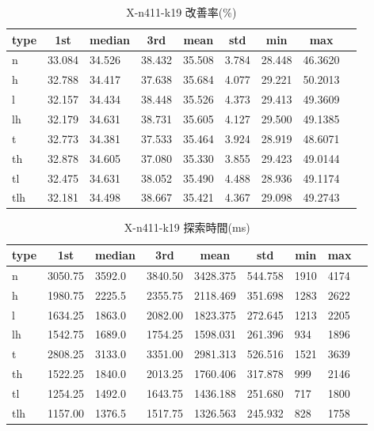 \begin{table}[htbp]
    \caption{X-n411-k19 改善率(\%)}
    \begin{tabular}{|l|l|l|l|l|l|l|l|l|}\hline
    \multicolumn{1}{|c|}{\textbf{type}}
    &\multicolumn{1}{|c|}{\textbf{1st}}
    &\multicolumn{1}{c|}{\textbf{median}}
    &\multicolumn{1}{c|}{\textbf{3rd}}
    &\multicolumn{1}{c|}{\textbf{mean}}
    &\multicolumn{1}{c|}{\textbf{std}}
    &\multicolumn{1}{c|}{\textbf{min}}
    &\multicolumn{1}{c|}{\textbf{max}}\\\hline
	n & 33.084 & 34.526 & 38.432 & 35.508 & 3.784 & 28.448 & 46.3620\\\hline
	h & 32.788 & 34.417 & 37.638 & 35.684 & 4.077 & 29.221 & 50.2013\\\hline
	l & 32.157 & 34.434 & 38.448 & 35.526 & 4.373 & 29.413 & 49.3609\\\hline
	lh & 32.179 & 34.631 & 38.731 & 35.605 & 4.127 & 29.500 & 49.1385\\\hline
	t & 32.773 & 34.381 & 37.533 & 35.464 & 3.924 & 28.919 & 48.6071\\\hline
	th & 32.878 & 34.605 & 37.080 & 35.330 & 3.855 & 29.423 & 49.0144\\\hline
	tl & 32.475 & 34.631 & 38.052 & 35.490 & 4.488 & 28.936 & 49.1174\\\hline
	tlh & 32.181 & 34.498 & 38.667 & 35.421 & 4.367 & 29.098 & 49.2743\\\hline
	\end{tabular}
\end{table}
\begin{table}[htbp]
    \caption{X-n411-k19 探索時間(ms)}
    \begin{tabular}{|l|l|l|l|l|l|l|l|l|}\hline
    \multicolumn{1}{|c|}{\textbf{type}}
    &\multicolumn{1}{|c|}{\textbf{1st}}
    &\multicolumn{1}{c|}{\textbf{median}}
    &\multicolumn{1}{c|}{\textbf{3rd}}
    &\multicolumn{1}{c|}{\textbf{mean}}
    &\multicolumn{1}{c|}{\textbf{std}}
    &\multicolumn{1}{c|}{\textbf{min}}
    &\multicolumn{1}{c|}{\textbf{max}}\\\hline
	n & 3050.75 & 3592.0 & 3840.50 & 3428.375 & 544.758 & 1910 & 4174\\\hline
	h & 1980.75 & 2225.5 & 2355.75 & 2118.469 & 351.698 & 1283 & 2622\\\hline
	l & 1634.25 & 1863.0 & 2082.00 & 1823.375 & 272.645 & 1213 & 2205\\\hline
	lh & 1542.75 & 1689.0 & 1754.25 & 1598.031 & 261.396 & 934 & 1896\\\hline
	t & 2808.25 & 3133.0 & 3351.00 & 2981.313 & 526.516 & 1521 & 3639\\\hline
	th & 1522.25 & 1840.0 & 2013.25 & 1760.406 & 317.878 & 999 & 2146\\\hline
	tl & 1254.25 & 1492.0 & 1643.75 & 1436.188 & 251.680 & 717 & 1800\\\hline
	tlh & 1157.00 & 1376.5 & 1517.75 & 1326.563 & 245.932 & 828 & 1758\\\hline
	\end{tabular}
\end{table}
